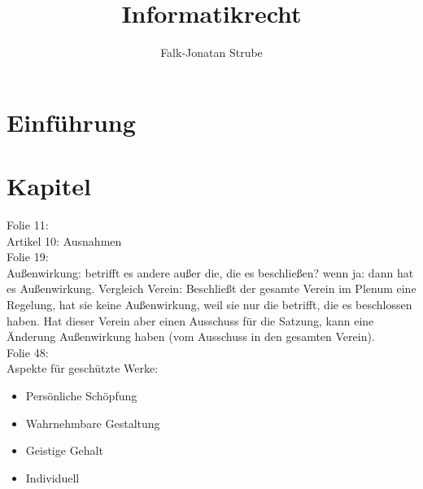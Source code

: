 \documentclass{scrreprt}
\title{Informatikrecht}
\author{Falk-Jonatan Strube}
\begin{document}
\maketitle
\tableofcontents

\chapter*{Einführung}

\chapter{Kapitel}

Folie 11:\\
Artikel 10: Ausnahmen\\
Folie 19:\\
Außenwirkung: betrifft es andere außer die, die es beschließen? wenn ja: dann hat es Außenwirkung. Vergleich Verein: Beschließt der gesamte Verein im Plenum eine Regelung, hat sie keine Außenwirkung, weil sie nur die betrifft, die es beschlossen haben. Hat dieser Verein aber einen Ausschuss für die Satzung, kann eine Änderung Außenwirkung haben (vom Ausschuss in den gesamten Verein).\\
Folie 48:\\
Aspekte für geschützte Werke:
\begin{itemize}
\item Persönliche Schöpfung
\item Wahrnehmbare Gestaltung
\item Geistige Gehalt
\item Individuell
\end{itemize}
\end{document}
